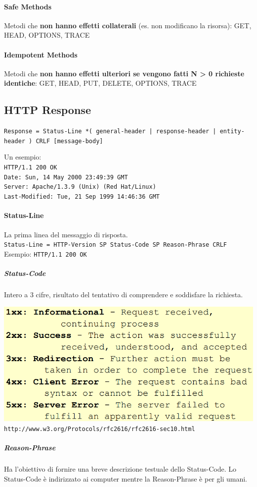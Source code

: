 \documentclass[10pt]{article}
\begin{document}
\begin{list}{}{}
\paragraph{Safe Methods} Metodi che \textbf{non hanno effetti collaterali} (es. non modificano la risorsa): GET, HEAD, OPTIONS, TRACE
\paragraph{Idempotent Methods} Metodi che \textbf{non hanno effetti ulteriori se vengono fatti N > 0 richieste identiche}: GET, HEAD, PUT, DELETE, OPTIONS, TRACE
\end{list}
\pagebreak
\subsection{HTTP Response}
\begin{center}
\texttt{Response = Status-Line *( general-header | response-header | entity-header ) CRLF [message-body]}
\end{center}
Un esempio:\\
\texttt{HTTP/1.1 200 OK\\
Date: Sun, 14 May 2000 23:49:39 GMT\\
Server: Apache/1.3.9 (Unix) (Red Hat/Linux)\\
Last-Modified: Tue, 21 Sep 1999 14:46:36 GMT}\\
\paragraph{Status-Line} La prima linea del messaggio di risposta.\\
\texttt{Status-Line = HTTP-Version SP Status-Code SP Reason-Phrase CRLF}\\Esempio: \texttt{HTTP/1.1 200 OK}
\subparagraph{Status-Code} Intero a 3 cifre, risultato del tentativo di comprendere e soddisfare la richiesta.\\\begin{center}
\includegraphics[scale=0.5]{httpresponsecode.png}\\\texttt{http://www.w3.org/Protocols/rfc2616/rfc2616-sec10.html}
\end{center}
\subparagraph{Reason-Phrase} Ha l'obiettivo di fornire una breve descrizione testuale dello Status-Code. Lo Status-Code è indirizzato ai computer mentre la Reason-Phrase è per gli umani.
\end{document}
